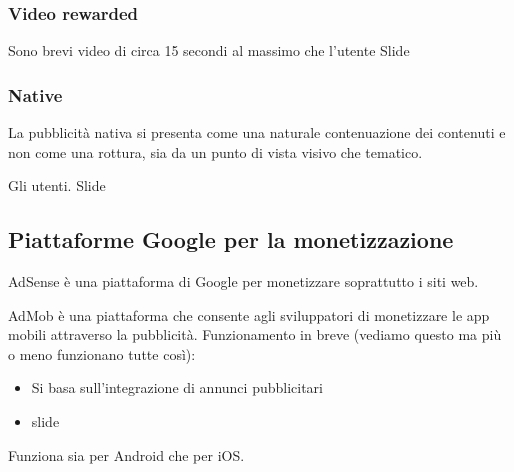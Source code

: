 \subsubsection{Video rewarded}
\par Sono brevi video di circa 15 secondi al massimo che l'utente Slide

\subsubsection{Native}
\par La pubblicità nativa si presenta come una naturale contenuazione dei contenuti e non come una rottura, sia da un punto di vista visivo che tematico.
\par Gli utenti. Slide

\subsection{Piattaforme Google per la monetizzazione}
\par AdSense è una piattaforma di Google per monetizzare soprattutto i siti web.
\par AdMob è una piattaforma che consente agli sviluppatori di monetizzare le app mobili attraverso la pubblicità. Funzionamento in breve (vediamo questo ma più o meno funzionano tutte così):
\begin{itemize}
    \item Si basa sull'integrazione di annunci pubblicitari 
    \item slide
\end{itemize}
\par Funziona sia per Android che per iOS.

